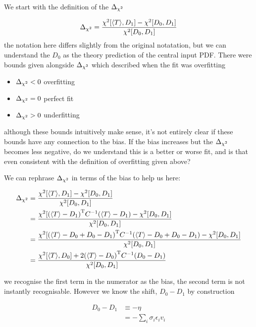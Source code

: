 We start with the definition of the $\Delta_{\chi^{2}}$

\begin{equation}
    \Delta_{\chi^{2}} = \frac{\chi^{2}[\langle T \rangle, D_{1}] - \chi^{2}[D_{0}, D_{1}]}{\chi^{2}[D_{0}, D_{1}]}
\end{equation}
the notation here differs slightly from the original notatation, but we can understand
the $D_{0}$ as the theory prediction of the central input PDF. There were bounds given alongside
$\Delta_{\chi^{2}}$ which described when the fit was overfitting

\begin{itemize}
    \item $\Delta_{\chi^{2}} < 0$ overfitting
    \item $\Delta_{\chi^{2}} = 0$ perfect fit
    \item $\Delta_{\chi^{2}} > 0$ underfitting 
\end{itemize}

although these bounds intuitively make sense, it's not entirely clear if these
bounds have any connection to the bias. If the bias increases but the $\Delta_{\chi^{2}}$ becomes
less negative, do we understand this is a better or worse fit, and is that even consistent
with the definition of overfitting given above?

We can rephrase $\Delta_{\chi^{2}}$ in terms of the bias to help us here:

\begin{equation}
    \begin{split}
        \Delta_{\chi^{2}} &= \frac{\chi^{2}[\langle T \rangle, D_{1}] - \chi^{2}[D_{0}, D_{1}]}{\chi^{2}[D_{0}, D_{1}]} \\
        &= \frac{\chi^{2}[{(\langle T \rangle - D_{1})}^{\mathrm{T}} C^{-1} (\langle T \rangle - D_{1}) - \chi^{2}[D_{0}, D_{1}]}{\chi^{2}[D_{0}, D_{1}]} \\
        &= \frac{\chi^{2}[{(\langle T \rangle - D_{0} + D_{0} - D_{1})}^{\mathrm{T}} C^{-1} (\langle T \rangle - D_{0} + D_{0} -D_{1}) - \chi^{2}[D_{0}, D_{1}]}{\chi^{2}[D_{0}, D_{1}]} \\
        &= \frac{ \chi^{2}[\langle T \rangle, D_{0}] + 2 {(\langle T \rangle - D_{0})}^{\mathrm{T}} C^{-1} (D_{0} - D_{1}) }{\chi^{2}[D_{0}, D_{1}]}
    \end{split}
    \label{eq: deltachi2tobias}
\end{equation}

we recognise the first term in the numerator as the bias, the second term is not
instantly recognisable. However we know the shift, $D_{0} - D_{1}$ by construction

\begin{equation}
    \begin{split}
        D_{0} - D_{1} &\equiv - \eta \\
        &= - \sum_{i} \sigma_{i} \epsilon_{i} v_{i}
    \end{split}
\end{equation}

